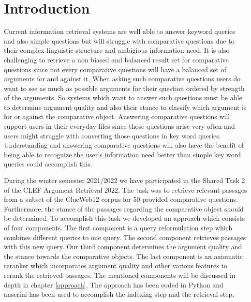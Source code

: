 \section{Introduction} \label{intro}
    Current information retrieval systems are well able to answer keyword queries and also simple questions but will struggle with comparative questions due to their complex linguistic structure and ambigious information need.  It is also challenging to retrieve  a non biased and balanced result set for comparative questions since not every comparative questions will have a balanced set of arguments for and against it. When asking such comparative questions users do want to see as much as possible arguments for their question  ordered by strength of the arguments. So systems which want to answer such questions must be able to determine argument quality and also their stance to classify which argument is for or against the comparative object.
    Answering comparative questions will support users in their everyday lifes since those questions arise very often and users might struggle with converting those questions in key word queries. Understanding and answering comparative questions will also have the benefit of being able to recognize the user's information need better than simple key word queries could accomplish this. 
    \par
    During the winter semester 2021/2022 we have participated in the Shared Task 2 of the CLEF Argument Retrieval 2022. The task was to retrieve relevant passages from a subset of the ClueWeb12 corpus for 50 provided comparative questions. Furthermore, the stance of the passages regarding the comparative object should be determined. To accomplish this task we developed an approach which consists of four components. The first component is a query reformulation step which combines different queries to one query. The second component retrieves passages with this new query. Our third component determines the argument quality and the stance towards the comparative objects. The last component is an axiomatic reranker which incorporates argument quality and other various features to rerank the retrieved passages. The mentioned components will be discussed in depth in chapter \ref{approach}. The approach has been coded in Python and anserini has been used to accomplish the indexing step and the retrieval step.   